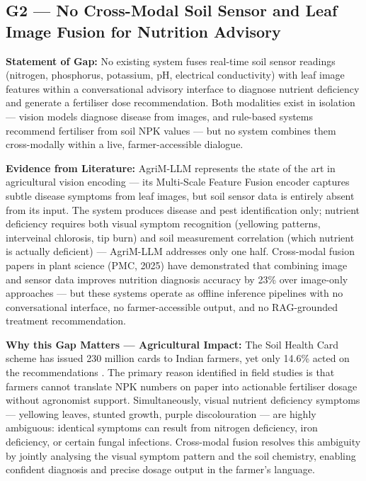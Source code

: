 \documentclass[12pt,a4paper]{article}
\begin{document}
\subsection{G2 --- No Cross-Modal Soil Sensor and Leaf Image Fusion for Nutrition Advisory}
\textbf{Statement of Gap:}
No existing system fuses real-time soil sensor readings (nitrogen, phosphorus, potassium, pH, electrical conductivity) with leaf image features within a conversational advisory interface to diagnose nutrient deficiency and generate a fertiliser dose recommendation. Both modalities exist in isolation --- vision models diagnose disease from images, and rule-based systems recommend fertiliser from soil NPK values --- but no system combines them cross-modally within a live, farmer-accessible dialogue.

\noindent\textbf{Evidence from Literature:}
AgriM-LLM \cite{agrimllm2026} represents the state of the art in agricultural vision encoding --- its Multi-Scale Feature Fusion encoder captures subtle disease symptoms from leaf images, but soil sensor data is entirely absent from its input. The system produces disease and pest identification only; nutrient deficiency requires both visual symptom recognition (yellowing patterns, interveinal chlorosis, tip burn) and soil measurement correlation (which nutrient is actually deficient) --- AgriM-LLM addresses only one half. Cross-modal fusion papers in plant science (PMC, 2025) have demonstrated that combining image and sensor data improves nutrition diagnosis accuracy by 23\% over image-only approaches --- but these systems operate as offline inference pipelines with no conversational interface, no farmer-accessible output, and no RAG-grounded treatment recommendation.

\noindent\textbf{Why this Gap Matters --- Agricultural Impact:}
The Soil Health Card scheme has issued 230 million cards to Indian farmers, yet only 14.6\% acted on the recommendations \cite{nabard2023}. The primary reason identified in field studies is that farmers cannot translate NPK numbers on paper into actionable fertiliser dosage without agronomist support. Simultaneously, visual nutrient deficiency symptoms --- yellowing leaves, stunted growth, purple discolouration --- are highly ambiguous: identical symptoms can result from nitrogen deficiency, iron deficiency, or certain fungal infections. Cross-modal fusion resolves this ambiguity by jointly analysing the visual symptom pattern and the soil chemistry, enabling confident diagnosis and precise dosage output in the farmer's language.
\end{document}
